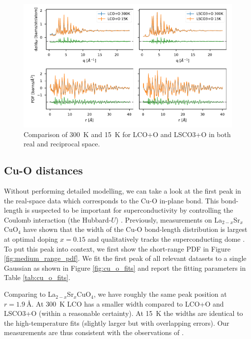 \begin{figure}
    \centering
    \includegraphics[width=\textwidth]{fig/pdf/temperature_comparison.pdf}
    \caption{Comparison of \SI{300}{\kelvin} and \SI{15}{\kelvin} for LCO+O and LSCO3+O in both real and reciprocal space.}
    \label{fig:temperature_comparision}    
\end{figure}

\subsection{Cu-O distances}
Without performing detailed modelling, we can take a look at the first peak in the real-space data which corresponds to the Cu-O in-plane bond. This bond-length is suspected to be important for superconductivity by controlling the Coulomb interaction (the Hubbard-$U$) \cite{Ivashko2019}. Previously, measurements on La$_{2-x}$Sr$_x$CuO$_{4}$ have shown that the width of the Cu-O bond-length distribution is largest at optimal doping $x=0.15$ and qualitatively tracks the superconducting dome \cite{Bozin2000}. To put this peak into context, we first show the short-range PDF in Figure \ref{fig:medium_range_pdf}. We fit the first peak of all relevant datasets to a single Gaussian as shown in Figure \ref{fig:cu_o_fits} and report the fitting parameters in Table \ref{tab:cu_o_fits}.

Comparing to La$_{2-x}$Sr$_x$CuO$_{4}$, we have roughly the same peak position at $r=\SI{1.9}{\angstrom}$. At \SI{300}{\kelvin} LCO has a smaller width compared to LCO+O and LSCO3+O (within a reasonable certainty). At \SI{15}{\kelvin} the widths are identical to the high-temperature fits (slightly larger but with overlapping errors). Our measurements are thus consistent with the observations of \cite{Bozin2000}.

